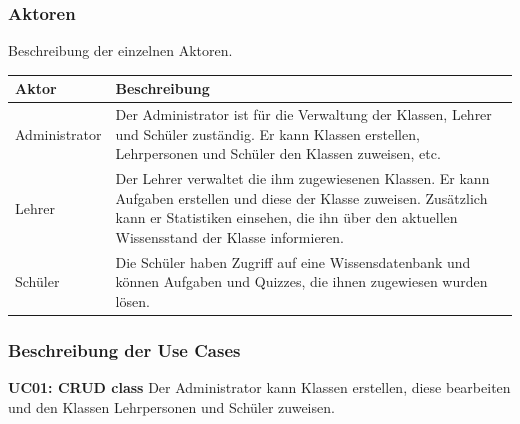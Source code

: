 \subsubsection{Aktoren}
Beschreibung der einzelnen Aktoren.
\newline
\begin{tabularx}{\textwidth}{| X | X |}
	\hline
		\textbf{Aktor} & \textbf{Beschreibung} \\
	\hline
		Administrator & Der Administrator ist für die Verwaltung der Klassen, Lehrer und Schüler zuständig. Er kann Klassen erstellen, Lehrpersonen und Schüler den Klassen zuweisen, etc. \\
	\hline
		Lehrer & Der Lehrer verwaltet die ihm zugewiesenen Klassen. Er kann Aufgaben erstellen und diese der Klasse zuweisen. Zusätzlich kann er Statistiken einsehen, die ihn über den aktuellen Wissensstand der Klasse informieren. \\
	\hline
		Schüler & Die Schüler haben Zugriff auf eine Wissensdatenbank und können Aufgaben und Quizzes, die ihnen zugewiesen wurden lösen. \\
	\hline
\end{tabularx}


\subsubsection{Beschreibung der Use Cases}

\textbf{UC01: CRUD class} Der Administrator kann Klassen erstellen, diese bearbeiten und den Klassen Lehrpersonen und Schüler zuweisen.

